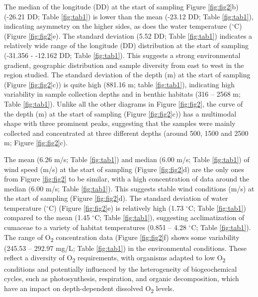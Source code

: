The median of the longitude (DD) at the start of sampling Figure \ref{fig:fig2}b) (-26.21 DD; Table \ref{fig:tab1}) is lower than the mean (-23.12 DD; Table \ref{fig:tab1}), indicating asymmetry on the higher sides, as does the water temperature ($^\circ$C) (Figure \ref{fig:fig2}e). The standard deviation (5.52 DD; Table \ref{fig:tab1}) indicates a relatively wide range of the longitude (DD) distribution at the start of sampling (-31.356 - -12.162 DD; Table \ref{fig:tab1}). This suggests a strong environmental gradient, geographic distribution and sample diversity from east to west in the region studied. The standard deviation of the depth (m) at the start of sampling (Figure \ref{fig:fig2}c)) is quite high (881.16 m; table \ref{fig:tab1}), indicating high variability in sample collection depths and in benthic habitats (316 – 2568 m; Table \ref{fig:tab1}). Unlike all the other diagrams in Figure \ref{fig:fig2}, the curve of the depth (m) at the start of sampling (Figure \ref{fig:fig2}c)) has a multimodal shape with three prominent peaks, suggesting that the samples were mainly collected and concentrated at three different depths (around 500, 1500 and 2500 m; Figure \ref{fig:fig2}c).

The mean (6.26 m/s; Table \ref{fig:tab1}) and median (6.00 m/s; Table \ref{fig:tab1}) of wind speed (m/s) at the start of sampling (Figure \ref{fig:fig2}d) are the only ones from Figure \ref{fig:fig2} to be similar, with a high concentration of data around the median (6.00 m/s; Table \ref{fig:tab1}). This suggests stable wind conditions (m/s) at the start of sampling (Figure \ref{fig:fig2}d). The standard deviation of water temperature ($^\circ$C) (Figure \ref{fig:fig2}e) is relatively high (1.73 $^\circ$C; Table \ref{fig:tab1}) compared to the mean (1.45 $^\circ$C; Table \ref{fig:tab1}), suggesting acclimatization of cumaceae to a variety of habitat temperatures (0.851 – 4.28 $^\circ$C; Table \ref{fig:tab1}). The range of O\textsubscript{2} concentration data (Figure \ref{fig:fig2}f) shows some variability (245.53 – 292.97 mg/L; Table \ref{fig:tab1}) in the environmental conditions. These reflect a diversity of O\textsubscript{2} requirements, with organisms adapted to low O\textsubscript{2} conditions and potentially influenced by the heterogeneity of biogeochemical cycles, such as photosynthesis, respiration, and organic decomposition, which have an impact on depth-dependent dissolved O\textsubscript{2} levels.

